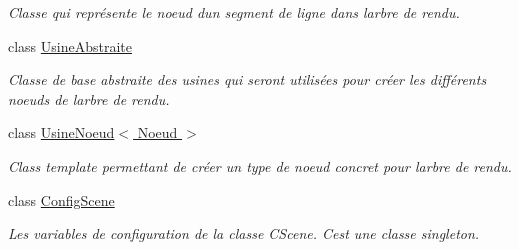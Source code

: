 \begin{DoxyCompactItemize}
\begin{DoxyCompactList}\small\item\em Classe qui représente le noeud d\textquotesingle{}un segment de ligne dans l\textquotesingle{}arbre de rendu. \end{DoxyCompactList}\item 
class \hyperlink{class_usine_abstraite}{Usine\+Abstraite}
\begin{DoxyCompactList}\small\item\em Classe de base abstraite des usines qui seront utilisées pour créer les différents noeuds de l\textquotesingle{}arbre de rendu. \end{DoxyCompactList}\item 
class \hyperlink{class_usine_noeud}{Usine\+Noeud$<$ Noeud $>$}
\begin{DoxyCompactList}\small\item\em Class template permettant de créer un type de noeud concret pour l\textquotesingle{}arbre de rendu. \end{DoxyCompactList}\item 
class \hyperlink{class_config_scene}{Config\+Scene}
\begin{DoxyCompactList}\small\item\em Les variables de configuration de la classe C\+Scene. C\textquotesingle{}est une classe singleton. \end{DoxyCompactList}\end{DoxyCompactItemize}
